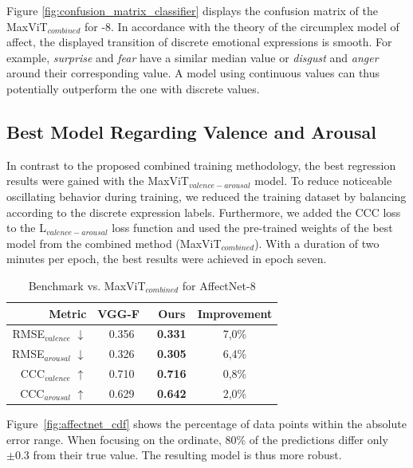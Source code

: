 Figure \ref{fig:confusion_matrix_classifier} displays the confusion matrix of the MaxViT$_{combined}$ for \affectnet{}-8. In accordance with the theory of the circumplex model of affect, the displayed transition of discrete emotional expressions is smooth. For example, \textit{surprise} and \textit{fear} have a similar median \aro{} value or \textit{disgust} and \textit{anger} around their corresponding \val{} value. A model using continuous values can thus potentially outperform the one with discrete values. %

\subsection{Best \affectnet{} Model Regarding Valence and Arousal}
  
In contrast to the proposed combined training methodology, the best regression results were gained with the MaxViT$_{valence-arousal}$ model. To reduce noticeable oscillating behavior during training, we reduced the training dataset by balancing according to the discrete expression labels. Furthermore, we added the CCC loss to the L$_{valence-arousal}$ loss function and used the pre-trained weights of the best model from the combined method (MaxViT$_{combined}$). With a duration of two minutes per epoch, the best results were achieved in epoch seven. 


\begin{table}[htbp]
\centering
\begin{tabular}{r | c | c | c}
\hline
\textbf{Metric} & \textbf{VGG-F}~\cite{bulat2022pretraining} & \textbf{Ours} & \textbf{Improvement} \\ 
\hline
RMSE$_{valence}$ $\downarrow$& 0.356 & \textbf{0.331} & 7,0\%\\
RMSE$_{arousal}$ $\downarrow$& 0.326 & \textbf{0.305} & 6,4\%\\
CCC$_{valence}$ $\uparrow$& 0.710 & \textbf{0.716} & 0,8\%\\
CCC$_{arousal}$ $\uparrow$& 0.629 & \textbf{0.642} & 2,0\%\\
\hline
\end{tabular}
\caption{Benchmark  vs. MaxViT$_{combined}$ for AffectNet-8}
\label{tab:benchmarkourapproach}
\end{table}

Figure~\ref{fig:affectnet_cdf} shows the percentage of data points within the absolute error range. When focusing on the ordinate, 80\% of the \va{} predictions differ only $\pm  0.3$ from their true value. The resulting model is thus more robust. %

